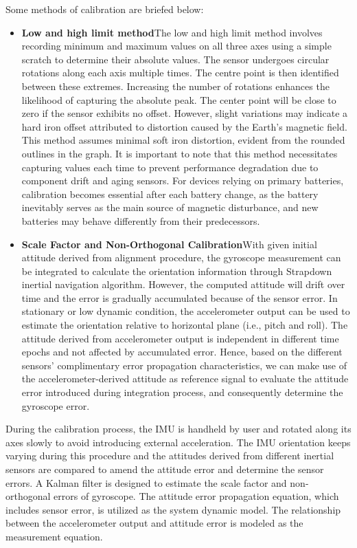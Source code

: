 	Some methods of calibration are briefed below:
\begin{itemize}
\item
\textbf{Low and high limit method}\newline The low and high limit method involves recording minimum and maximum values on all three axes using a simple scratch to determine their absolute values. The sensor undergoes circular rotations along each axis multiple times. The centre point is then identified between these extremes.\cite{Gyroplace:2023}
Increasing the number of rotations enhances the likelihood of capturing the absolute peak. The center point will be close to zero if the sensor exhibits no offset. However, slight variations may indicate a hard iron offset attributed to distortion caused by the Earth’s magnetic field.\cite{Gyroplace:2023}
This method assumes minimal soft iron distortion, evident from the rounded outlines in the graph.\cite{Gyroplace:2023}
It is important to note that this method necessitates capturing values each time to prevent performance degradation due to component drift and aging sensors. For devices relying on primary batteries, calibration becomes essential after each battery change, as the battery inevitably serves as the main source of magnetic disturbance, and new batteries may behave differently from their predecessors.\cite{Gyroplace:2023}

\item
\textbf{Scale Factor and Non-Orthogonal Calibration}\newline With given initial attitude derived from alignment procedure, the gyroscope measurement can be integrated to calculate the orientation information through Strapdown inertial navigation algorithm. However, the computed attitude will drift over time and the error is gradually accumulated because of the sensor error. In stationary or low dynamic condition, the accelerometer output can be used to estimate the orientation relative to horizontal plane (i.e., pitch and roll).\cite{Gyroplace:2023} The attitude derived from accelerometer output is independent in different time epochs and not affected by accumulated error. Hence, based on the different sensors’ complimentary error propagation characteristics, we can make use of the accelerometer-derived attitude as reference signal to evaluate the attitude error introduced during integration process, and consequently determine the gyroscope error.\cite{Gyroplace:2023}
\end{itemize}
During the calibration process, the IMU is handheld by user and rotated along its axes slowly to avoid introducing external acceleration. The IMU orientation keeps varying during this procedure and the attitudes derived from different inertial sensors are compared to amend the attitude error and determine the sensor errors. A Kalman filter is designed to estimate the scale factor and non-orthogonal errors of gyroscope. The attitude error propagation equation, which includes sensor error, is utilized as the system dynamic model. The relationship between the accelerometer output and attitude error is modeled as the measurement equation.\cite{Gyroplace:2023}
\newline
